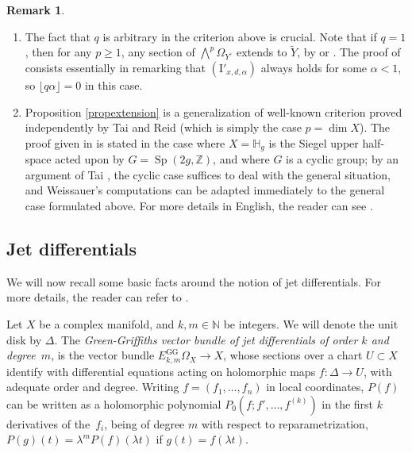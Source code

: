 \documentclass[JEP,XML,SOM,Unicode, NoEqCountersInSection,NoFloatCountersInSection,published]{cedram}
\newcommand{\rGG}{\mathrm{GG}}
\newcommand{\rI}{\mathrm{I}}
\DeclareMathOperator{\Sp}{Sp}
\theoremstyle{theorem}
\theoremstyle{definition}
\newtheorem{remark}[proposition]{Remark}
\begin{document}
\skpt
\begin{remark}
\begin{enumerate}
\item
The fact that $q$ is arbitrary in the criterion above is crucial. Note that if $q = 1$, then for any $p \geq 1$, any section of $\bigwedge^p \Omega_{Y^\circ}$ extends to $\widetilde{Y}$, \eg by \cite{Freitag} or \cite{GKKP}. The proof of \cite{Freitag} consists essentially in remarking that $(\rI'_{x, d, \alpha})$ always holds for some $\alpha < 1$, so $\lfloor q \alpha \rfloor = 0$ in this case.

\item
Proposition \ref{propextension} is a generalization of well-known criterion proved independently by Tai \cite{tai82} and Reid \cite{reid79} (which is simply the case $p = \dim X$). The proof given in \cite{wei86} is stated in the case where $X = \mathbb H_g$ is the Siegel upper half-space acted upon by $G = \Sp(2g, \mathbb Z)$, and where \(G\) is a cyclic group; by an argument of Tai \cite[Prop.\,3.1]{tai82}, the cyclic case suffices to deal with the general situation, and Weissauer's computations can be adapted immediately to the general case formulated above. For more details in English, the reader can see \eg \cite[\S 4]{cad18}.
\end{enumerate}
\end{remark}

\subsection{Jet differentials}\label{jets}

We will now recall some basic facts around the notion of jet differentials. For more details, the reader can refer to \cite[\S 7]{dem12a}.

Let $X$ be a complex manifold, and $k, m \in \mathbb N$ be integers. We will denote the unit disk by $\Delta$. The \emph{Green-Griffiths vector bundle of jet differentials of order $k$ and degree~$m$}, is the vector bundle $E_{k, m}^{\rGG} \Omega_X \to X$, whose sections over a chart $U \subset X$ identify with differential equations acting on holomorphic maps $f : \Delta \to U$, with adequate order and degree. Writing $f = (f_1,\dots, f_n)$ in local coordinates, \(P(f)\) can be written as a holomorphic polynomial $P_{0}(f;f', \dotsc, f^{(k)})$ in the first \(k\) derivatives of the~\(f_i\), being of degree \(m\) with respect to reparametrization, \ie $P(g)(t) = \lambda^m P(f)(\lambda t)$ if $g(t) = f(\lambda t)$.
\end{document}
